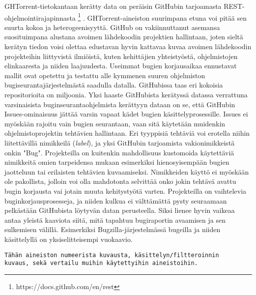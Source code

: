\documentclass[utf8]{gradu3}
\begin{document}
GHTorrent-tietokantaan kerätty data on peräisin GitHubin tarjoamasta
REST-ohjelmointirajapinnasta \footnote{https://docs.github.com/en/rest}
\parencite{Gousi13}. GHTorrent-aineiston suurimpana etuna voi pitää sen suurta
kokoa ja heterogeenisyyttä. GitHub on vakiinnuttanut asemansa suosituimpana
alustana avoimen lähdekoodin projektien hallintaan, joten sieltä kerätyn tiedon
voisi olettaa edustavan hyvin kattavaa kuvaa avoimen lähdekoodin projekteihin
liittyvistä ilmiöistä, kuten kehittäjien yhteistyöstä, ohjelmistojen
elinkaaresta ja niiden laajuudesta. Useimmat bugien korjausaikaa ennustavat
mallit ovat opetettu ja testattu alle kymmenen suuren ohjelmiston
bugiseurantajärjestelmästä saadulla datalla. GitHubissa taas eri kokoisia
repositorioita on miljoonia. Yksi haaste GitHubista kerätyssä datassa verrattuna
varsinaisista buginseurantaohjelmista kerättyyn dataan on se, että GitHubin
Issues-ominaisuus jättää varsin vapaat kädet bugien käsittelyprosessille. Issues
ei myöskään rajoitu vain bugien seurantaan, vaan sitä käytetään muidenkin
ohjelmistoprojektin tehtävien hallintaan. Eri tyyppisiä tehtäviä voi erotella
niihin liitettävillä nimikkeilä (\textit{label}), ja yksi GitHubin tarjoamista
vakionimikkeistä onkin "Bug". Projekteilla on kuitenkin mahdollisuus kustomoida
käytettäviä nimikkeitä omien tarpeidensa mukaan esimerkiksi hienosyisempään
bugien jaotteluun tai erilaisten tehtävien kuvaamiseksi. Nimikkeiden käyttö ei
myöskään ole pakollista, jolloin voi olla mahdotonta selvittää onko jokin
tehtävä avattu bugin korjausta vai jotain muuta kehitystyötä varten.
Projekteilla on vaihtelevia buginkorjausprosesseja, ja niiden kulkua ei
välttämättä pysty seuraamaan pelkästään GitHubista löytyvän datan perusteella.
Siksi lienee hyvin vaikeaa antaa yleistä kaaviota siitä, mitä tapahtuu
bugiraportin avaamisen ja sen sulkemisen välillä. Esimerkiksi
Bugzilla-järjestelmässä bugeilla ja niiden käsittelyllä on yksiselitteisempi
vuokaavio.

\begin{verbatim}
Tähän aineiston numeerista kuvausta, käsittelyn/filtteroinnin 
kuvaus, sekä vertailu muihin käytettyihin aineistoihin.
\end{verbatim}



\end{document}
